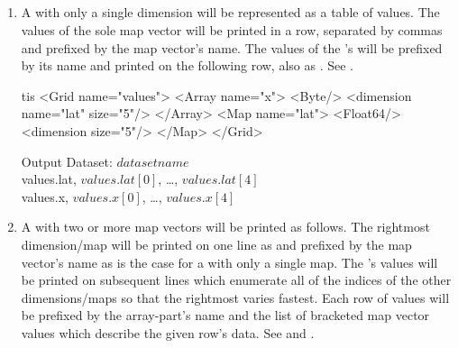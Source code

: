 \documentclass[justify]{dods-paper}
\begin{document}
\subsection{\Grids}
\label{sec-ascii-grid}


\begin{enumerate}
\item A \Grid with only a single dimension will be represented as a table of
  values. The values of the sole map vector will be printed in a row,
  separated by commas and prefixed by the map vector's name. The values of
  the \Grid's \Array will be prefixed by its name and printed on the following
  row, also as \CSVs.  See .

\begin{minipage}[t]{3in}

\begin{vcode}{tis}
<Grid name="values">
  <Array name="x">
    <Byte/>
    <dimension name="lat" size="5"/>
  </Array>
  <Map name="lat">
    <Float64/>
    <dimension size="5"/>
  </Map>
</Grid>
\end{vcode}
\end{minipage}
\begin{minipage}[t]{5in}
\begin{textoutput}{Output}
Dataset: $dataset name$\\
values.lat, $values.lat[0]$, \ldots, $values.lat[4]$\\
values.x, $values.x[0]$, \ldots, $values.x[4]$
\end{textoutput}
\end{minipage}


\item A \Grid with two or more map vectors will be printed as follows. The
  rightmost dimension/map will be printed on one line as \CSVs and prefixed
  by the map vector's name as is the case for a \Grid with only a single map.
  The \Array's values will be printed on subsequent lines which enumerate
  all of the indices of the other dimensions/maps so that the rightmost
  varies fastest. Each row of values will be prefixed by the array-part's
  name and the list of bracketed map vector values which describe the given
  row's data. See  and .


\begin{minipage}[t]{2.5in}


\end{minipage}
\end{enumerate}
\end{document}
